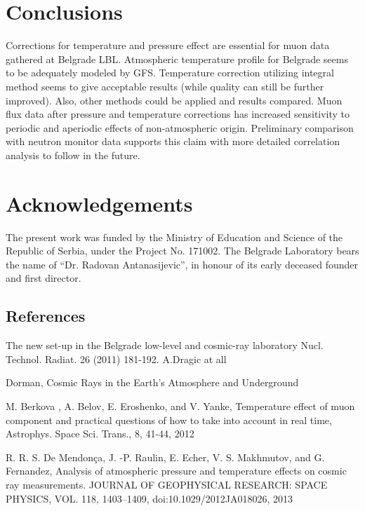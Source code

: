 \documentclass[twocolumn,twoside,slac_two]{revtex4}
\begin{document}
\section{Conclusions}
Corrections for temperature and pressure effect are essential for muon data gathered at
Belgrade LBL. Atmospheric temperature profile for Belgrade seems to be adequately modeled by GFS. Temperature correction utilizing integral method seems to give acceptable results (while quality can still be further improved). Also, other methods could be applied and results compared. Muon flux data after pressure and temperature corrections has increased sensitivity to periodic and aperiodic effects of non-atmospheric origin. Preliminary comparison with neutron monitor data supports this claim with more detailed correlation analysis to follow in the future.

\section{Acknowledgements}
The present work was funded by the Ministry of Education and Science of the Republic of Serbia, under the Project No. 171002. The Belgrade Laboratory bears  the  name  of  “Dr.  Radovan  Antanasijevic”, in honour of its early deceased founder and first director. 



\bigskip %
%
\begin{thebibliography}{9}   %
\section{References}

The new set-up in the Belgrade low-level and cosmic-ray laboratory Nucl. Technol. Radiat. 26 (2011) 181-192. A.Dragic at all

Dorman, Cosmic Rays in the Earth’s Atmosphere and Underground

M. Berkova , A. Belov, E. Eroshenko, and V. Yanke, Temperature effect of muon component and practical questions of how to take into account in real time, Astrophys. Space Sci. Trans., 8, 41-44, 2012

R. R. S. De Mendonça, J. -P. Raulin, E. Echer, V. S. Makhmutov, and G. Fernandez, Analysis of atmospheric pressure and temperature effects on cosmic ray measurements. JOURNAL OF GEOPHYSICAL RESEARCH: SPACE PHYSICS, VOL. 118, 1403–1409, doi:10.1029/2012JA018026, 2013

\end{thebibliography}
\end{document}
